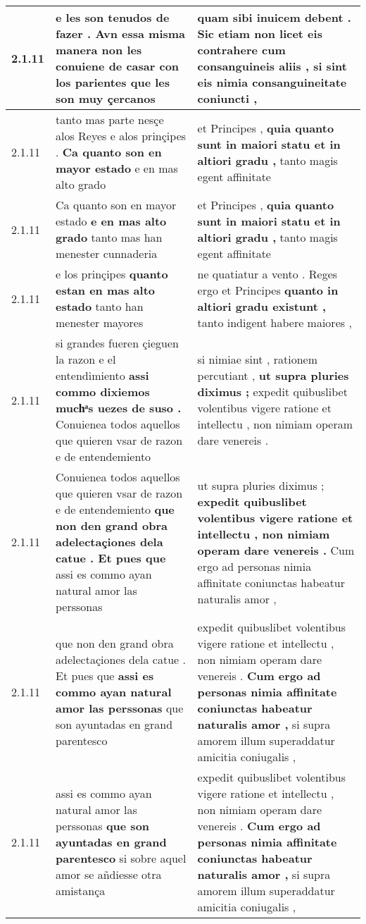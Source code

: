 \begin{tabular}{|p{1cm}|p{6.5cm}|p{6.5cm}|}
2.1.11 & e les son tenudos de fazer . \textbf{ Avn essa misma manera non les conuiene de casar con los parientes } que les son muy çercanos & quam sibi inuicem debent . \textbf{ Sic etiam non licet eis contrahere cum consanguineis aliis , } si sint eis nimia consanguineitate coniuncti , \\\hline
2.1.11 & tanto mas parte nesçe alos Reyes e alos prinçipes . \textbf{ Ca quanto son en mayor estado } e en mas alto grado & et Principes , \textbf{ quia quanto sunt in maiori statu et in altiori gradu , } tanto magis egent affinitate \\\hline
2.1.11 & Ca quanto son en mayor estado \textbf{ e en mas alto grado } tanto mas han menester cunnaderia & et Principes , \textbf{ quia quanto sunt in maiori statu et in altiori gradu , } tanto magis egent affinitate \\\hline
2.1.11 & e los prinçipes \textbf{ quanto estan en mas alto estado } tanto han menester mayores & ne quatiatur a vento . Reges ergo et Principes \textbf{ quanto in altiori gradu existunt , } tanto indigent habere maiores , \\\hline
2.1.11 & si grandes fueren çieguen la razon e el entendimiento \textbf{ assi commo dixiemos muchͣs uezes de suso . } Conuienea todos aquellos que quieren vsar de razon e de entendemiento & si nimiae sint , rationem percutiant , \textbf{ ut supra pluries diximus ; } expedit quibuslibet volentibus vigere ratione et intellectu , non nimiam operam dare venereis . \\\hline
2.1.11 & Conuienea todos aquellos que quieren vsar de razon e de entendemiento \textbf{ que non den grand obra adelectaçiones dela catue . Et pues que } assi es commo ayan natural amor las perssonas & ut supra pluries diximus ; \textbf{ expedit quibuslibet volentibus vigere ratione et intellectu , non nimiam operam dare venereis . } Cum ergo ad personas nimia affinitate coniunctas habeatur naturalis amor , \\\hline
2.1.11 & que non den grand obra adelectaçiones dela catue . Et pues que \textbf{ assi es commo ayan natural amor las perssonas } que son ayuntadas en grand parentesco & expedit quibuslibet volentibus vigere ratione et intellectu , non nimiam operam dare venereis . \textbf{ Cum ergo ad personas nimia affinitate coniunctas habeatur naturalis amor , } si supra amorem illum superaddatur amicitia coniugalis , \\\hline
2.1.11 & assi es commo ayan natural amor las perssonas \textbf{ que son ayuntadas en grand parentesco } si sobre aquel amor se añdiesse otra amistança & expedit quibuslibet volentibus vigere ratione et intellectu , non nimiam operam dare venereis . \textbf{ Cum ergo ad personas nimia affinitate coniunctas habeatur naturalis amor , } si supra amorem illum superaddatur amicitia coniugalis , \\\hline

\end{tabular}
